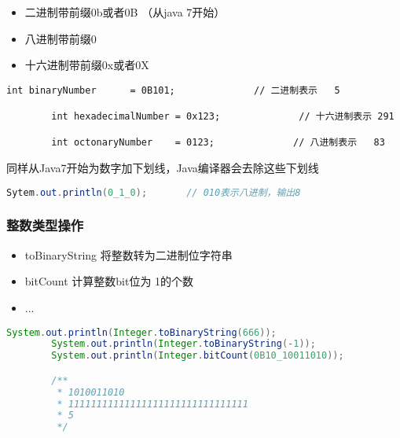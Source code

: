\begin{itemize}
    \item   二进制带前缀0b或者0B （从java 7开始）
    \item   八进制带前缀0
    \item   十六进制带前缀0x或者0X
\end{itemize}


\begin{lstlisting}[style=cjava]
        int binaryNumber      = 0B101;              // 二进制表示   5 

        int hexadecimalNumber = 0x123;              // 十六进制表示 291   

        int octonaryNumber    = 0123;              // 八进制表示   83
\end{lstlisting}



同样从Java7开始为数字加下划线，Java编译器会去除这些下划线

\begin{lstlisting}[language=java]
        Sytem.out.println(0_1_0);       // 010表示八进制，输出8
\end{lstlisting}


\subsubsection{整数类型操作}

\begin{itemize}
        \item   toBinaryString  将整数转为二进制位字符串
        \item   bitCount        计算整数bit位为 1的个数
        \item   ...
    \end{itemize}

\begin{lstlisting}[language=java]
        System.out.println(Integer.toBinaryString(666));
        System.out.println(Integer.toBinaryString(-1));
        System.out.println(Integer.bitCount(0B10_10011010));

        /**
         * 1010011010
         * 11111111111111111111111111111111
         * 5
         */
\end{lstlisting}
    




